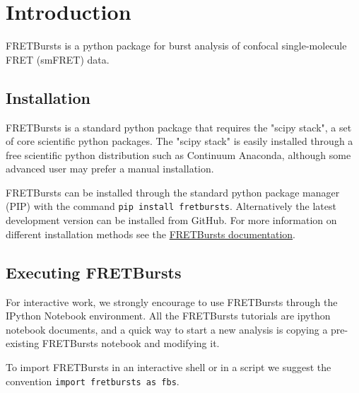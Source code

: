 \section{Introduction}

FRETBursts is a python package for burst analysis of confocal single-molecule FRET (smFRET) data.

\subsection{Installation}
FRETBursts is a standard python package that requires the "scipy stack", a set of core scientific python packages.
The "scipy stack" is easily installed through a free scientific python distribution such as Continuum Anaconda, although some advanced user may prefer a manual installation.

FRETBursts can be installed through the standard python package manager (PIP) with 
the command \verb|pip install fretbursts|. Alternatively the latest development version can be installed from GitHub.
For more information on different installation methods see the \href{http://fretbursts.readthedocs.org/installation.html#installation}{FRETBursts documentation}.

\subsection{Executing FRETBursts}
For interactive work, we strongly encourage to use FRETBursts through the IPython Notebook environment. All the FRETBursts tutorials are ipython notebook documents, and a quick way to start a new analysis is copying a pre-existing FRETBursts notebook and modifying it.

To import FRETBursts in an interactive shell or in a script we suggest the convention \verb|import fretbursts as fbs|.
